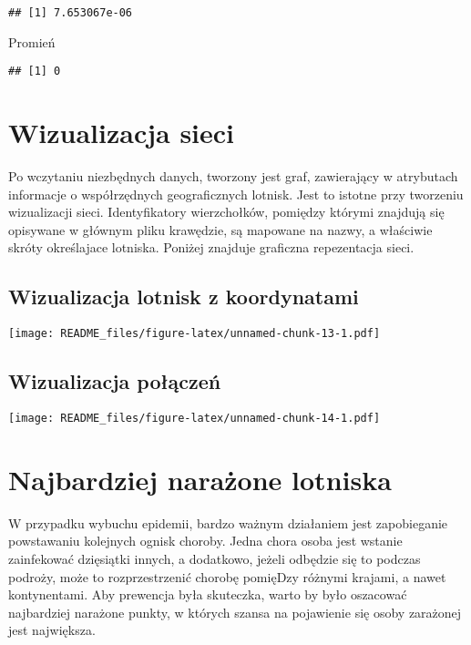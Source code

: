 \documentclass[
]{article}
\begin{document}
\begin{verbatim}
## [1] 7.653067e-06
\end{verbatim}

Promień

\begin{verbatim}
## [1] 0
\end{verbatim}

\hypertarget{wizualizacja-sieci}{%
\section{Wizualizacja sieci}\label{wizualizacja-sieci}}

Po wczytaniu niezbędnych danych, tworzony jest graf, zawierający w
atrybutach informacje o współrzędnych geograficznych lotnisk. Jest to
istotne przy tworzeniu wizualizacji sieci. Identyfikatory wierzchołków,
pomiędzy którymi znajdują się opisywane w głównym pliku krawędzie, są
mapowane na nazwy, a właściwie skróty określajace lotniska. Poniżej
znajduje graficzna repezentacja sieci.

\hypertarget{wizualizacja-lotnisk-z-koordynatami}{%
\subsection{Wizualizacja lotnisk z
koordynatami}\label{wizualizacja-lotnisk-z-koordynatami}}

\texttt{[image: README\_files/figure-latex/unnamed-chunk-13-1.pdf]}

\hypertarget{wizualizacja-poux142ux105czeux144}{%
\subsection{Wizualizacja
połączeń}\label{wizualizacja-poux142ux105czeux144}}

\texttt{[image: README\_files/figure-latex/unnamed-chunk-14-1.pdf]}

\hypertarget{najbardziej-naraux17cone-lotniska}{%
\section{Najbardziej narażone
lotniska}\label{najbardziej-naraux17cone-lotniska}}

W przypadku wybuchu epidemii, bardzo ważnym działaniem jest zapobieganie
powstawaniu kolejnych ognisk choroby. Jedna chora osoba jest wstanie
zainfekować dzięsiątki innych, a dodatkowo, jeżeli odbędzie się to
podczas podroży, może to rozprzestrzenić chorobę pomięDzy różnymi
krajami, a nawet kontynentami. Aby prewencja była skuteczka, warto by
było oszacować najbardziej narażone punkty, w których szansa na
pojawienie się osoby zarażonej jest największa.
\end{document}
